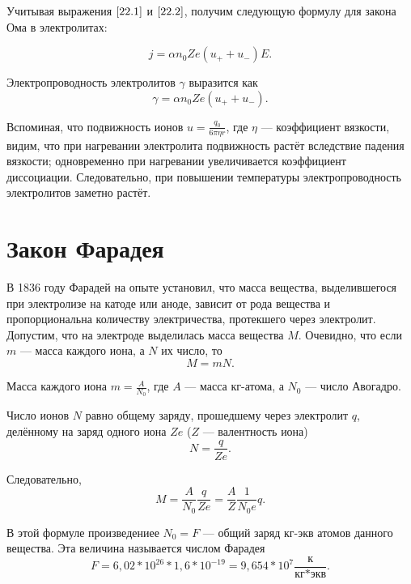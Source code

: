 \documentclass[a4paper,10pt]{book}
\begin{document}
Учитывая выражения $\ref{22.1}$ и $\ref{22.2}$, получим следующую формулу для закона Ома в электролитах:

\begin{equation}\label{22.3}
j = \alpha n_0 Ze (u_+ + u_-)E.
\end{equation}

Электропроводность электролитов $\gamma$ выразится как\begin{equation}\label{22.4}
\gamma = \alpha n_0 Ze (u_+ + u_-).
\end{equation}

Вспоминая, что подвижность ионов $u=\frac{q_0}{6\pi \eta r}$, где $\eta$ — коэффициент вязкости, видим, что при нагревании электролита подвижность растёт вследствие падения вязкости; одновременно при нагревании увеличивается коэффициент диссоциации. Следовательно, при повышении температуры электропроводность электролитов заметно растёт.

\section{Закон Фарадея}

В 1836 году Фарадей на опыте установил, что масса вещества, выделившегося при электролизе на катоде или аноде, зависит от рода вещества и пропорциональна количеству электричества, протекшего через электролит. Допустим, что на электроде выделилась масса вещества $M$. Очевидно, что если $m$ — масса каждого иона, а $N$ их число, то \begin{equation*}
M=mN.
\end{equation*}

Масса каждого иона $m=\frac{A}{N_0}$, где $A$ — масса $\textit{кг-атома}$, а $N_0$ — число Авогадро.

Число ионов $N$ равно общему заряду, прошедшему через электролит $q$, делённому на заряд одного иона $Ze$ ($Z$ — валентность иона)\begin{equation*}
N=\frac{q}{Ze}.
\end{equation*}

Следовательно, \begin{equation*}
M=\frac{A}{N_0}\frac{q}{Ze} = \frac{A}{Z}\frac{1}{N_0 e}q.
\end{equation*}

В этой формуле произведениее $N_0 = F$ — общий заряд $\textit{кг-экв}$ атомов данного вещества. Эта величина называется числом Фарадея\begin{equation*}
F=6,02*10^{26}*1,6*10^{-19} = 9,654 * 10^7  \frac{\textit{к}}{\textit{кг}*\textit{экв}}.
\end{equation*}
\end{document}
